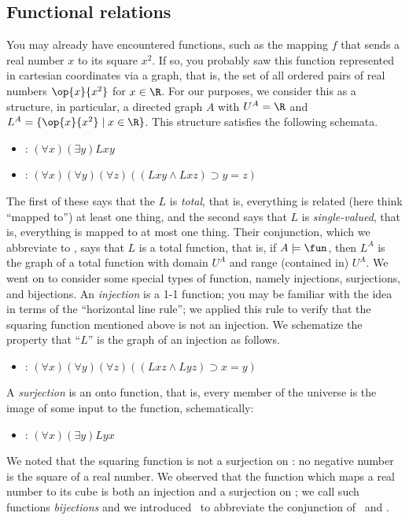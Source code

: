 \subsection{Functional relations}

You may already have encountered functions, such as the mapping $f$ that sends a real number $x$ to its square $x^2$. If so, you probably saw this function represented in cartesian coordinates via a graph, that is, the set of all ordered pairs of real numbers $\op{x}{x^2}$ for $x\in\R$. For our purposes, we consider this as a structure, in particular, a directed graph $A$ with $U^A=\R$ and $L^A=\{\op{x}{x^2} \mid x\in\R\}$. This structure satisfies the following schemata.
\begin{itemize}
\item
\tot: $(\forall x)(\exists y)Lxy$
\item
\sv: $(\forall x)(\forall y)(\forall z)((Lxy\wedge Lxz)\supset y=z)$
\end{itemize}
The first of these says that the $L$ is \emph{total}, that is, everything is related (here think ``mapped to'') at least one thing, and the second says that $L$ is \emph{single-valued}, that is, everything is mapped to at most one thing. Their conjunction, which we abbreviate to \fun, says that $L$ is a total function, that is, if $A\models\fun$, then $L^A$ is the graph of a total function with domain $U^A$ and range (contained in) $U^A$. We went on to consider some special types of function, namely injections, surjections, and bijections. An \emph{injection} is a 1-1 function; you may be familiar with the idea in terms of the ``horizontal line rule''; we applied this rule to verify that the squaring function mentioned above is not an injection. We schematize the property that ``$L$'' is the graph of an injection as follows.
\begin{itemize}
\item \inj: $(\forall x)(\forall y)(\forall z)((Lxz\wedge Lyz)\supset x=y)$
\end{itemize}
A \emph{surjection} is an onto function, that is, every member of the universe is the image of some input to the function, schematically:
\begin{itemize}
\item \sur: $(\forall x)(\exists y)Lyx$
\end{itemize}
We noted that the squaring function is not a surjection on \R: no negative number is the square of a real number. We observed that the function which maps a real number to its cube is both an injection and a surjection on \R;  we call such functions \emph{bijections} and we introduced \bij\ to abbreviate the conjunction of \inj\ and \sur.

